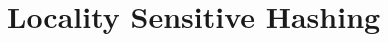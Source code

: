 \documentclass[conference]{IEEEtran}
\newcommand{ \NewMaterial }[ 1 ] {\textcolor{black}{#1}}
\begin{document}





\section{Locality Sensitive Hashing}\label{sec:background}
\end{document}

